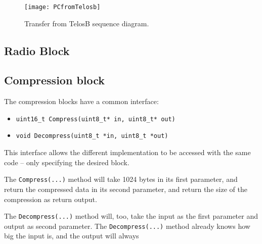 \begin{figure}[H]
	\centering
	\texttt{[image: PCfromTelosb]}
	\caption{Transfer from TelosB sequence diagram.}
	\label{transferfromtelos}
\end{figure}

\subsection{Radio Block}

\subsection{Compression block}
The compression blocks have a common interface: 

\begin{itemize}
    \item \texttt{uint16\_t Compress(uint8\_t* in, uint8\_t* out)}
    \item \texttt{void Decompress(uint8\_t *in, uint8\_t *out)}
\end{itemize}

This interface allows the different implementation to be accessed with the same code -- only specifying the desired block.

The \texttt{Compress(...)} method will take 1024 bytes in its first parameter, and return the compressed data in its second parameter, and return the size of the compression as return output.

The \texttt{Decompress(...)} method will, too, take the input as the first parameter and output as second parameter. 
The \texttt{Decompress(...)} method already knows how big the input is, and the output will always 
